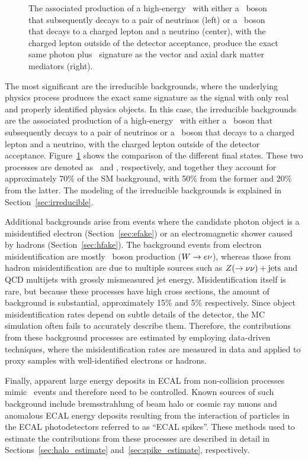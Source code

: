 \begin{figure}[htbp]
{  }
  \caption{
    The associated production of a high-energy \Pgg\ with either a \PZ\ boson that subsequently decays to a pair of neutrinos (left) or a \PW\ boson that decays to a charged lepton and a neutrino (center), with the charged lepton outside of the detector acceptance, produce the exact same photon plus \met\ signature as the vector and axial dark matter mediators (right).
    }
    \label{fig:zgwg_diagram}
\end{figure}

The most significant are the irreducible backgrounds, where the underlying physics process produces the exact same signature as the signal with only real and properly identified physics objects.
In this case, the irreducible backgrounds are the associated production of a high-energy \Pgg\ with either a \PZ\ boson that subsequently decays to a pair of neutrinos or a \PW\ boson that decays to a charged lepton and a neutrino, with the charged lepton outside of the detector acceptance.
Figure~\ref{fig:zgwg_diagram} shows the comparison of the different final states.
These two processes are denoted as \zinvg\ and \wlng, respectively, and together they account for approximately 70\% of the SM background, with 50\% from the former and 20\% from the latter.
The modeling of the irreducible backgrounds is explained in Section~\ref{sec:irreducible}.

Additional backgrounds arise from events where the candidate photon object is a misidentified electron (Section~\ref{sec:efake}) or an electromagnetic shower caused by hadrons (Section~\ref{sec:hfake}). 
The background events from electron misidentification are mostly \PW\ boson production (${W}\rightarrow {e}\nu$), whereas those from hadron misidentification are due to multiple sources such as ${Z}(\rightarrow\nu\nu)+\text{jets}$ and QCD multijets with grossly mismeasured jet energy. 
Misidentification itself is rare, but because these processes have high cross sections, the amount of background is substantial, approximately 15\% and 5\% respectively.
Since object misidentification rates depend on subtle details of the detector, the MC simulation often fails to accurately describe them.
Therefore, the contributions from these background processes are estimated by employing data-driven techniques, where the misidentification rates are measured in data and applied to proxy samples with well-identified electrons or hadrons.

Finally, apparent large energy deposits in ECAL from non-collision processes mimic \gmet\ events and therefore need to be controlled. 
Known sources of such background include bremsstrahlung of beam halo or cosmic ray muons and anomalous ECAL energy deposits resulting from the interaction of particles in the ECAL photodetectors referred to as ``ECAL spikes''. 
These methods used to estimate the contributions from these processes are described in detail in Sections~\ref{sec:halo_estimate} and~\ref{sec:spike_estimate}, respectively.

